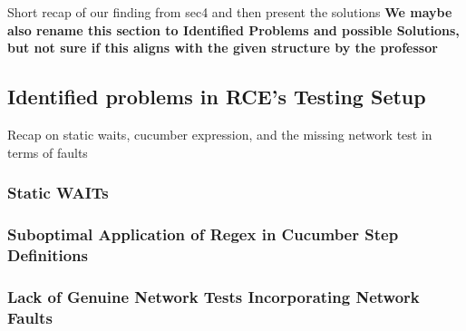 Short recap of our finding from sec4 and then present the solutions
\textbf{We maybe also rename this section to Identified Problems and possible Solutions, but not sure if this aligns with the given structure by the professor}
\subsection{Identified problems in RCE's Testing Setup}
Recap on static waits, cucumber expression, and the missing network test in terms of faults

\subsubsection{Static WAITs}
\subsubsection{Suboptimal Application of Regex in Cucumber Step Definitions}
\subsubsection{Lack of Genuine Network Tests Incorporating Network Faults}
